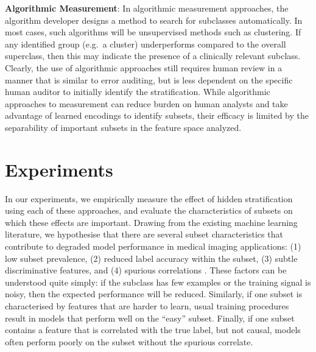 \documentclass{article}
\begin{document}
\textbf{Algorithmic Measurement}: In algorithmic measurement approaches, the algorithm developer designs a method to search for subclasses automatically. 
In most cases, such algorithms will be unsupervised methods such as clustering. 
If any identified group (e.g.~a cluster) underperforms compared to the overall superclass, then this may indicate the presence of a clinically relevant subclass.
Clearly, the use of algorithmic approaches still requires human review in a manner that is similar to error auditing, but is less dependent on the specific human auditor to initially identify the stratification.  
While algorithmic approaches to measurement can reduce burden on human analysts and take advantage of learned encodings to identify subsets, their efficacy is limited by the separability of important subsets in the feature space analyzed.

\section{Experiments}

In our experiments, we empirically measure the effect of hidden stratification using each of these approaches, and evaluate the characteristics of subsets on which these effects are important.  
Drawing from the existing machine learning literature, we hypothesise that there are several subset characteristics that contribute to degraded model performance in medical imaging applications: (1) low subset prevalence, (2) reduced label accuracy within the subset, (3) subtle discriminative features, and (4) spurious correlations \citep{Selbst2017-gz}. 
These factors can be understood quite simply: if the subclass has few examples or the training signal is noisy, then the expected performance will be reduced.  
Similarly, if one subset is characterised by features that are harder to learn, usual training procedures result in models that perform well on the ``easy'' subset.
Finally, if one subset contains a feature that is correlated with the true label, but not causal, models often perform poorly on the subset without the spurious correlate.
\end{document}
